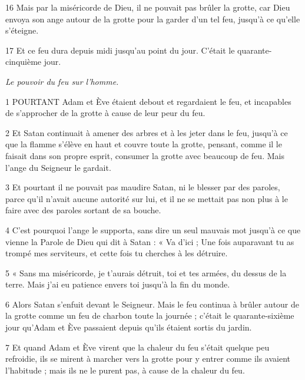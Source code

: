 \par 16 Mais par la miséricorde de Dieu, il ne pouvait pas brûler la grotte, car Dieu envoya son ange autour de la grotte pour la garder d'un tel feu, jusqu'à ce qu'elle s'éteigne.

\par 17 Et ce feu dura depuis midi jusqu'au point du jour. C'était le quarante-cinquième jour.


\par \textit{Le pouvoir du feu sur l'homme.}

\par 1 POURTANT Adam et Ève étaient debout et regardaient le feu, et incapables de s'approcher de la grotte à cause de leur peur du feu.

\par 2 Et Satan continuait à amener des arbres et à les jeter dans le feu, jusqu'à ce que la flamme s'élève en haut et couvre toute la grotte, pensant, comme il le faisait dans son propre esprit, consumer la grotte avec beaucoup de feu. Mais l'ange du Seigneur le gardait.

\par 3 Et pourtant il ne pouvait pas maudire Satan, ni le blesser par des paroles, parce qu'il n'avait aucune autorité sur lui, et il ne se mettait pas non plus à le faire avec des paroles sortant de sa bouche.

\par 4 C'est pourquoi l'ange le supporta, sans dire un seul mauvais mot jusqu'à ce que vienne la Parole de Dieu qui dit à Satan : « Va d'ici ; Une fois auparavant tu as trompé mes serviteurs, et cette fois tu cherches à les détruire.

\par 5 « Sans ma miséricorde, je t'aurais détruit, toi et tes armées, du dessus de la terre. Mais j’ai eu patience envers toi jusqu’à la fin du monde.

\par 6 Alors Satan s'enfuit devant le Seigneur. Mais le feu continua à brûler autour de la grotte comme un feu de charbon toute la journée ; c'était le quarante-sixième jour qu'Adam et Ève passaient depuis qu'ils étaient sortis du jardin.

\par 7 Et quand Adam et Ève virent que la chaleur du feu s'était quelque peu refroidie, ils se mirent à marcher vers la grotte pour y entrer comme ils avaient l'habitude ; mais ils ne le purent pas, à cause de la chaleur du feu.


